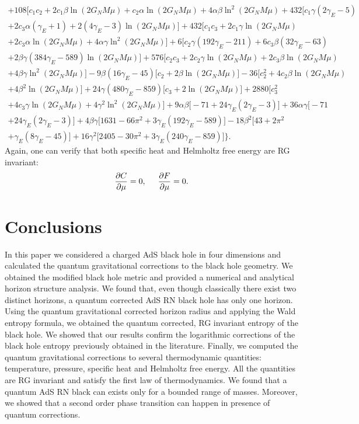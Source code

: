 \documentclass[10pt,a4paper]{article}
\begin{document}
\begin{multline}
+108\Big[c_1c_2+2c_1\beta\ln(2G_NM\mu)+c_2\alpha\ln(2G_NM\mu)+4\alpha\beta\ln^2(2G_NM\mu)+432\Big[c_1\gamma(2\gamma_E-5)\\
+2c_3\alpha(\gamma_E+1)+2(4\gamma_E-3)\ln(2G_NM\mu)\Big]+432\Big[c_1c_3+2c_1\gamma\ln(2G_NM\mu)\\
+2c_3\alpha\ln(2G_NM\mu)+4\alpha\gamma\ln^2(2G_NM\mu)\Big]+6\Big[c_2\gamma(192\gamma_E-211)+6c_3\beta(32\gamma_E-63)\\
+2\beta\gamma(384\gamma_E-589)\ln(2G_NM\mu)\Big]+576\Big[c_2c_3+2c_2\gamma\ln(2G_NM\mu)+2c_3\beta\ln(2G_NM\mu)\\
+4\beta\gamma\ln^2(2G_NM\mu)\Big]-9\beta(16\gamma_E-45)\Big[c_2+2\beta\ln(2G_NM\mu)\Big]-36\Big[c^2_2+4c_2\beta\ln(2G_NM\mu)\\
+4\beta^2\ln(2G_NM\mu)\Big]+24\gamma(480\gamma_E-859)\Big[c_3+2\ln(2G_NM\mu)\Big]+2880\Big[c^2_3\\+4c_3\gamma\ln(2G_NM\mu)
+4\gamma^2\ln^2(2G_NM\mu)\Big]+9\alpha\beta\Big[-71+24\gamma_E(2\gamma_E-3)\Big]+36\alpha\gamma\Big[-71\\+24\gamma_E(2\gamma_E-3)\Big]+4\beta\gamma\Big[1631-66\pi^2
+3\gamma_E(192\gamma_E-589)\Big]-18\beta^2\Big[43+2\pi^2\\+\gamma_E(8\gamma_E-45)\Big]
+16\gamma^2\Big[2405-30\pi^2+3\gamma_E(240\gamma_E-859)\Big]\bigg\}.
\end{multline}
Again, one can verify that both specific heat and Helmholtz free energy are RG invariant:
\begin{equation}
    \frac{\partial C}{\partial \mu}=0, \hspace{5mm} \frac{\partial F}{\partial \mu}=0.
\end{equation}
\section{Conclusions}\label{sec:conclusions}
In this paper we considered a charged AdS black hole in four dimensions and calculated the quantum gravitational corrections to the black hole geometry. We obtained the modified black hole metric and provided a numerical and analytical horizon structure analysis. We found that, even though classically there exist two distinct horizons, a quantum corrected AdS RN black hole has only one horizon. 
Using the quantum gravitational corrected horizon radius and applying the Wald entropy formula, we obtained the quantum corrected, RG invariant entropy of the black hole. 
We showed that our results confirm the logarithmic corrections of the black hole entropy previously obtained in the literature. 
Finally, we computed the quantum gravitational corrections to several thermodynamic quantities: temperature, pressure, specific heat and Helmholtz free energy. All the quantities are RG invariant and satisfy the first law of thermodynamics. We found that a quantum AdS RN black can exists only for a bounded range of masses. Moreover, we showed that a second order phase transition can happen in presence of quantum corrections. 
\end{document}
